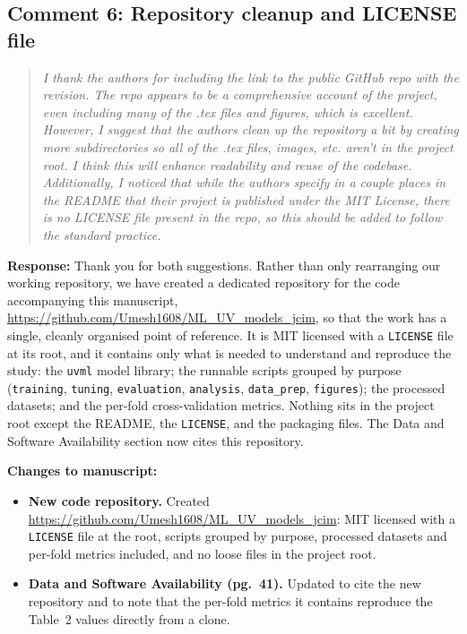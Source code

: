 \documentclass[11pt]{article}
\newenvironment{reviewer}{%
  \begin{quote}\itshape\color{black!70}}{%
  \end{quote}}
\newcommand{\response}[1]{\noindent\textbf{Response:} #1\par\medskip}
\newenvironment{changes}{%
  \noindent\textbf{Changes to manuscript:}
  \begin{itemize}[leftmargin=2em,itemsep=2pt]}{%
  \end{itemize}\medskip}
\begin{document}
\subsection*{Comment 6: Repository cleanup and LICENSE file}
\begin{reviewer}
I thank the authors for including the link to the public GitHub repo with the revision. The repo appears to be a comprehensive account of the project, even including many of the .tex files and figures, which is excellent. However, I suggest that the authors clean up the repository a bit by creating more subdirectories so all of the .tex files, images, etc. aren't in the project root. I think this will enhance readability and reuse of the codebase. Additionally, I noticed that while the authors specify in a couple places in the README that their project is published under the MIT License, there is no LICENSE file present in the repo, so this should be added to follow the standard practice.
\end{reviewer}
\response{Thank you for both suggestions. Rather than only rearranging our working repository, we have created a dedicated repository for the code accompanying this manuscript, \url{https://github.com/Umesh1608/ML_UV_models_jcim}, so that the work has a single, cleanly organised point of reference. It is MIT licensed with a \texttt{LICENSE} file at its root, and it contains only what is needed to understand and reproduce the study: the \texttt{uvml} model library; the runnable scripts grouped by purpose (\texttt{training}, \texttt{tuning}, \texttt{evaluation}, \texttt{analysis}, \texttt{data\_prep}, \texttt{figures}); the processed datasets; and the per-fold cross-validation metrics. Nothing sits in the project root except the README, the \texttt{LICENSE}, and the packaging files. The Data and Software Availability section now cites this repository.}
\begin{changes}
  \item \textbf{New code repository.} Created \url{https://github.com/Umesh1608/ML_UV_models_jcim}: MIT licensed with a \texttt{LICENSE} file at the root, scripts grouped by purpose, processed datasets and per-fold metrics included, and no loose files in the project root.
  \item \textbf{Data and Software Availability (pg.\ 41).} Updated to cite the new repository and to note that the per-fold metrics it contains reproduce the Table~2 values directly from a clone.
\end{changes}
\end{document}
